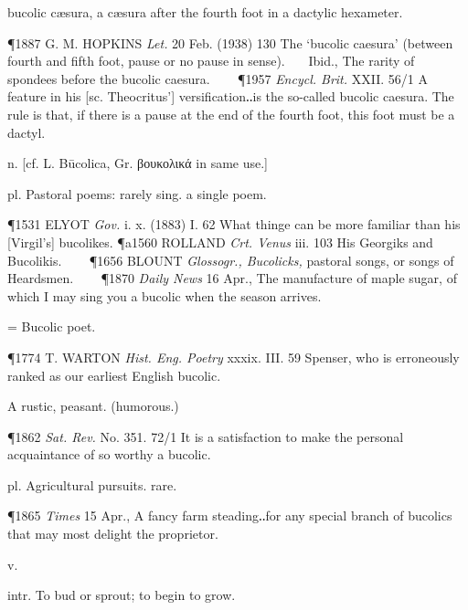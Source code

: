 \begin{description}[wide, labelwidth=!, labelindent=0pt]
\begin{myenumerate}
 bucolic cæsura, a cæsura after the fourth foot in a dactylic hexameter.

\P 1887 G. M. HOPKINS  \textit{Let.} 20 Feb. (1938) 130 The ‘bucolic caesura’ (between fourth and fifth foot, pause or no pause in sense).    Ibid., The rarity of spondees before the bucolic caesura.    
\P 1957 \textit{Encycl.  Brit.} XXII. 56/1 A feature in his [sc. Theocritus'] versification‥is the so-called bucolic caesura. The rule is that, if there is a pause at the end of the fourth foot, this foot must be a dactyl.

 n. [cf. L. Būcolica, Gr. βουκολικά in same use.]

 pl. Pastoral poems: rarely sing. a single poem.

\P 1531 ELYOT  \textit{Gov.} i. x. (1883) I. 62 What thinge can be more familiar than his [Virgil's] bucolikes.
\P a1560 ROLLAND  \textit{Crt. Venus} iii. 103 His Georgiks and Bucolikis.    
\P 1656 BLOUNT  \textit{Glossogr., Bucolicks,} pastoral songs, or songs of Heardsmen.    
\P 1870  \textit{Daily News} 16 Apr., The manufacture of maple sugar, of which I may sing you a bucolic when the season arrives.

 = Bucolic poet.

\P 1774 T. WARTON  \textit{Hist. Eng. Poetry} xxxix. III. 59 Spenser, who is erroneously ranked as our earliest English bucolic.

 A rustic, peasant. (humorous.)

\P 1862 \textit{Sat. Rev.} No. 351. 72/1 It is a satisfaction to make the personal acquaintance of so worthy a bucolic.

 pl. Agricultural pursuits. rare.

\P 1865  \textit{Times} 15 Apr., A fancy farm steading‥for any special branch of bucolics that may most delight the proprietor.
\end{myenumerate}


 v.

\noindent {}


\vspace{-0.3cm}

\begin{myenumerate}

 intr. To bud or sprout; to begin to grow.


\end{myenumerate}
\end{description}
